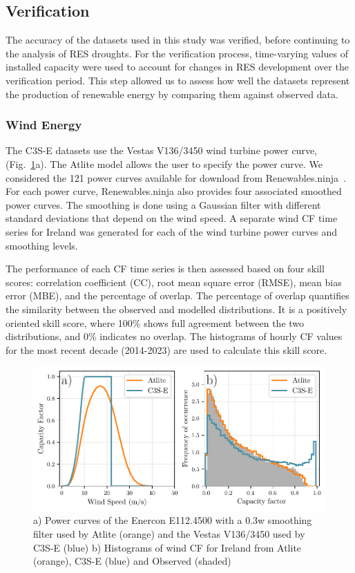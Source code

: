 \documentclass[preprint, 12pt]{elsarticle}
\begin{document}
\subsection{Verification}
\label{sec:verification}

The accuracy of the datasets used in this study was verified, before continuing to the analysis of RES droughts. For the verification process, time-varying values of installed capacity were used to account for changes in RES development over the verification period. This step allowed us to assess how well the datasets represent the production of renewable energy by comparing them against observed data.

\subsubsection{Wind Energy}
\label{sec:wind_verification}

The C3S-E datasets use the Vestas V136/3450 wind turbine power curve, (Fig.~\ref{fig:power_curve}a). The Atlite model allows the user to specify the power curve. We considered the 121 power curves available for download from Renewables.ninja~\citep{staffell2016wake}. For each power curve, Renewables.ninja also provides four associated smoothed power curves. The smoothing is done using a Gaussian filter with different standard deviations that depend on the wind speed. A separate wind CF time series for Ireland was generated for each of the wind turbine power curves and smoothing levels.

The performance of each CF time series is then assessed based on four skill scores: correlation coefficient (CC), root mean square error (RMSE), mean bias error (MBE), and the percentage of overlap. The percentage of overlap quantifies the similarity between the observed and modelled distributions. It is a positively oriented skill score, where 100\% shows full agreement between the two distributions, and 0\% indicates no overlap. The histograms of hourly CF values for the most recent decade (2014-2023) are used to calculate this skill score.

\begin{figure}[!ht]
	\centering
	\includegraphics[width=\textwidth]{verification_power_curve.pdf}
	\caption{a) Power curves of the Enercon E112.4500 with a 0.3w smoothing filter used by Atlite (orange) and the Vestas V136/3450 used by C3S-E (blue) b) Histograms of wind CF for Ireland from Atlite (orange), C3S-E (blue) and Observed (shaded)}
	\label{fig:power_curve}
\end{figure}
\end{document}

